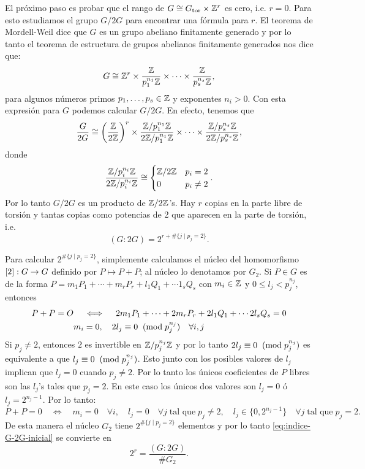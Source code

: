 \documentclass[../../tesis_maestria]{subfiles}
\begin{document}
El próximo paso es probar que el rango de $G\cong G_\mathrm{tor}\times\mathbb{Z}^r$ es cero, i.e. $r=0$. Para esto estudiamos el grupo $G/2G$ para encontrar una fórmula para $r$. El teorema de Mordell-Weil dice que $G$ es un grupo abeliano finitamente generado y por lo tanto el teorema de estructura de grupos abelianos finitamente generados nos dice que:
\[
	G\cong\mathbb{Z}^r\times\frac{\mathbb{Z}}{p_1^{n_1}\mathbb{Z}}\times\cdots\times\frac{\mathbb{Z}}{p_s^{n_s}\mathbb{Z}},
\]
para algunos números primos $p_1,\ldots,p_s\in\mathbb{Z}$ y exponentes $n_i>0$. Con esta expresión para $G$ podemos calcular $G/2G$. En efecto, tenemos que
\[
	\frac{G}{2G}\cong\left(\frac{\mathbb{Z}}{2\mathbb{Z}}\right)^r\times\frac{\mathbb{Z}/p_1^{n_1}\mathbb{Z}}{2\mathbb{Z}/p_1^{n_1}\mathbb{Z}}\times\cdots\times\frac{\mathbb{Z}/p_s^{n_s}\mathbb{Z}}{2\mathbb{Z}/p_s^{n_s}\mathbb{Z}},
\]
donde
\[
	\frac{\mathbb{Z}/p_i^{n_i}\mathbb{Z}}{2\mathbb{Z}/p_i^{n_i}\mathbb{Z}}\cong
	\begin{cases}
	\mathbb{Z}/2\mathbb{Z} & p_i=2\\
	0 & p_i\neq 2
	\end{cases}.
\]
Por lo tanto $G/2G$ es un producto de $\mathbb{Z}/2\mathbb{Z}$'s. Hay $r$ copias en la parte libre de torsión y tantas copias como potencias de 2 que aparecen en la parte de torsión, i.e.
\begin{equation}\label{eq:indice-G-2G-inicial}
	(G:2G)=2^{r+\#\{j\mid p_j=2\}}.
\end{equation}

Para calcular $2^{\#\{j\mid p_j=2\}}$, simplemente calculamos el núcleo del homomorfismo $[2]:G\rightarrow G$ definido por $P\mapsto P+P$; al núcleo lo denotamos por $G_2$. Si $P\in G$ es de la forma $P=m_1 P_1+\cdots+m_r P_r+l_1Q_1+\cdots 1_s Q_s$ con $m_i\in\mathbb{Z}$ y $0\leq l_j<p_j^{n_j}$, entonces
\begin{align*}
	P+P=O&\quad\iff\quad 2m_1 P_1+\cdots+2m_r P_r+2l_1Q_1+\cdots 2l_s Q_s=0\\
&m_i=0,\quad 2l_j\equiv0\;\;(\mathrm{mod}\; p_j^{n_j})\quad\forall i,j	
\end{align*}
Si $p_j\neq2$, entonces $2$ es invertible en $\mathbb{Z}/p_j^{n_j}\mathbb{Z}$ y por lo tanto $2l_j\equiv0\;\;(\mathrm{mod}\; p_j^{n_j})$ es equivalente a que $l_j\equiv0\;\;(\mathrm{mod}\; p_j^{n_j})$. Esto junto con los posibles valores de $l_j$ implican que $l_j=0$ cuando $p_j\neq2$. Por lo tanto los únicos coeficientes de $P$ libres son las $l_j$'s tales que $p_j=2$. En este caso los únicos dos valores son $l_j=0$ ó $l_j=2^{n_j-1}$. Por lo tanto:
\[
	P+P=0\quad\iff\quad m_i=0\quad\forall i,\quad l_j=0\quad\forall j\;\text{tal que}\; p_j\neq2, \quad l_j\in\{0,2^{n_j-1}\}\quad\forall j\;\text{tal que}\; p_j=2.
\]
De esta manera el núcleo $G_2$ tiene $2^{\#\{j\mid p_j=2\}}$ elementos y por lo tanto \eqref{eq:indice-G-2G-inicial} se convierte en
\begin{equation}\label{eq:indice-G-2G}
	2^r =\frac{(G:2G)}{\# G_2}.
\end{equation}
\end{document}
